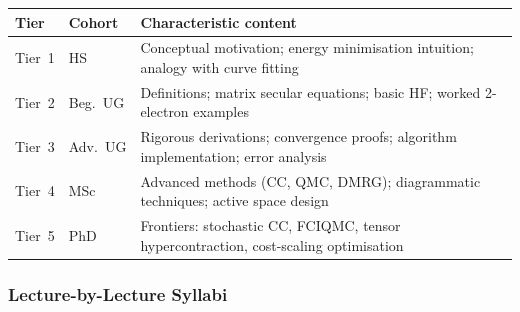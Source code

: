 \documentclass[11pt,a4paper]{article}
\begin{document}
\begin{center}
\begin{tabular}{llp{9cm}}
\toprule
\textbf{Tier} & \textbf{Cohort} & \textbf{Characteristic content}\\
\midrule
Tier~1 & HS       & Conceptual motivation; energy minimisation intuition; analogy with curve fitting\\
Tier~2 & Beg.\ UG & Definitions; matrix secular equations; basic HF; worked 2-electron examples\\
Tier~3 & Adv.\ UG & Rigorous derivations; convergence proofs; algorithm implementation; error analysis\\
Tier~4 & MSc      & Advanced methods (CC, QMC, DMRG); diagrammatic techniques; active space design\\
Tier~5 & PhD      & Frontiers: stochastic CC, FCIQMC, tensor hypercontraction, cost-scaling optimisation\\
\bottomrule
\end{tabular}
\end{center}

\subsubsection*{Lecture-by-Lecture Syllabi}
\end{document}

